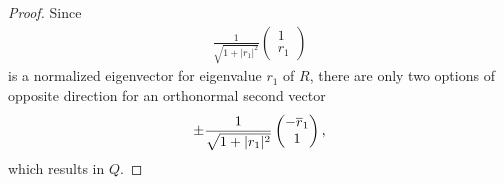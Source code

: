 \begin{proof}
	Since
	\begin{align*}
		\frac{1}{\sqrt{1+|r_1|^2}} \begin{pmatrix}
			1 \\
			r_1
		\end{pmatrix}
	\end{align*}
	is a normalized eigenvector for eigenvalue \(r_1\) of \(R\), there are
	only two options of opposite direction for an orthonormal second vector
	\begin{align*}
		\pm \frac{1}{\sqrt{1+|r_1|^2}} \begin{pmatrix}
			-\overline{r}_1 \\
			1
		\end{pmatrix},
	\end{align*}
	which results in \(Q\).
	

\end{proof}
